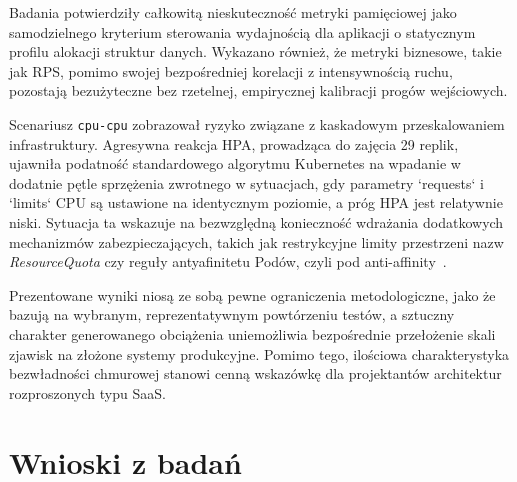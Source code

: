 Badania potwierdziły całkowitą nieskuteczność metryki pamięciowej jako samodzielnego kryterium sterowania wydajnością dla aplikacji o statycznym profilu alokacji struktur danych. Wykazano również, że metryki biznesowe, takie jak RPS, pomimo swojej bezpośredniej korelacji z intensywnością ruchu, pozostają bezużyteczne bez rzetelnej, empirycznej kalibracji progów wejściowych.

Scenariusz \texttt{cpu-cpu} zobrazował ryzyko związane z kaskadowym przeskalowaniem infrastruktury. Agresywna reakcja HPA, prowadząca do zajęcia 29 replik, ujawniła podatność standardowego algorytmu Kubernetes na wpadanie w dodatnie pętle sprzężenia zwrotnego w sytuacjach, gdy parametry `requests` i `limits` CPU są ustawione na identycznym poziomie, a próg HPA jest relatywnie niski. Sytuacja ta wskazuje na bezwzględną konieczność wdrażania dodatkowych mechanizmów zabezpieczających, takich jak restrykcyjne limity przestrzeni nazw \textit{ResourceQuota} czy reguły antyafinitetu Podów, czyli pod anti-affinity~\cite{cloudnative2018}.

Prezentowane wyniki niosą ze sobą pewne ograniczenia metodologiczne, jako że bazują na wybranym, reprezentatywnym powtórzeniu testów, a sztuczny charakter generowanego obciążenia uniemożliwia bezpośrednie przełożenie skali zjawisk na złożone systemy produkcyjne. Pomimo tego, ilościowa charakterystyka bezwładności chmurowej stanowi cenną wskazówkę dla projektantów architektur rozproszonych typu SaaS.

\section{Wnioski z badań}

